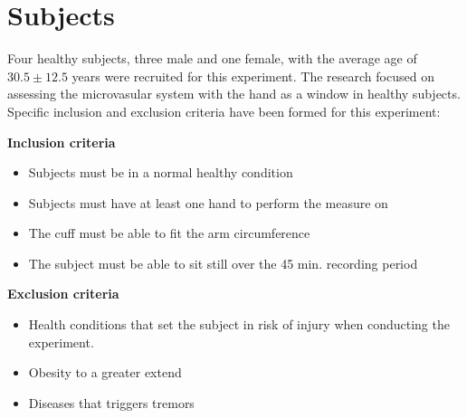 \section{Subjects}

Four healthy subjects, three male and one female, with the average age of $30.5 \pm 12.5$ years were recruited for this experiment. The research focused on assessing the microvasular system with the hand as a window in healthy subjects. Specific inclusion and exclusion criteria have been formed for this experiment:

\textbf{Inclusion criteria}
\begin{itemize}[noitemsep]
	\item Subjects must be in a normal healthy condition 
	\item Subjects must have at least one hand to perform the measure on
	\item The cuff must be able to fit the arm circumference 
	\item The subject must be able to sit still over the 45 min. recording period 
\end{itemize}

\textbf{Exclusion criteria}
\begin{itemize}[noitemsep]
	\item Health conditions that set the subject in risk of injury when conducting the experiment.
	
	\item Obesity to a greater extend
	\item Diseases that triggers tremors   
\end{itemize} 
